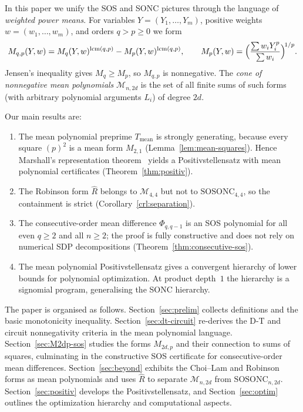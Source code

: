 \documentclass{amsart}
\theoremstyle{definition}
\numberwithin{equation}{section}
\begin{document}
In this paper we unify the SOS and SONC pictures through the language of
\emph{weighted power means}.  For variables $Y=(Y_1,\dots,Y_m)$, positive
weights $w=(w_1,\dots,w_m)$, and orders $q>p\ge0$ we form
\[
M_{q,p}(Y,w)=M_q(Y,w)^{\operatorname{lcm}(q,p)}-M_p(Y,w)^{\operatorname{lcm}(q,p)},
\qquad
M_p(Y,w)=\Bigl(\frac{\sum w_iY_i^p}{\sum w_i}\Bigr)^{\!1/p}.
\]
Jensen's inequality gives $M_q\ge M_p$, so $M_{q,p}$ is nonnegative.
The \emph{cone of nonnegative mean polynomials} $\mathcal{M}_{n,2d}$ is the
set of all finite sums of such forms (with arbitrary polynomial arguments
$L_i$) of degree $2d$.

Our main results are:

\begin{enumerate}
  \item The mean polynomial preprime $T_{\mathrm{mean}}$ is strongly
  generating, because every square $(p)^2$ is a mean form $M_{2,1}$
  (Lemma~\ref{lem:mean-squares}).  Hence Marshall's representation
  theorem~\cite{Marshall02} yields a Positivstellensatz with mean polynomial
  certificates (Theorem~\ref{thm:positiv}).

  \item The Robinson form $\hat{R}$ belongs to $\mathcal{M}_{4,4}$ but not
  to $\mathrm{SOSONC}_{4,4}$, so the containment is strict
  (Corollary~\ref{crl:separation}).

  \item The consecutive-order mean difference $\Phi_{q,q-1}$ is an SOS
  polynomial for all even $q\ge2$ and all $n\ge2$; the proof is fully
  constructive and does not rely on numerical SDP decompositions
  (Theorem~\ref{thm:consecutive-sos}).

  \item The mean polynomial Positivstellensatz gives a convergent hierarchy
  of lower bounds for polynomial optimization.  At product depth~$1$ the
  hierarchy is a signomial program, generalising the SONC hierarchy.
\end{enumerate}

The paper is organised as follows.  Section~\ref{sec:prelim} collects
definitions and the basic monotonicity inequality.  Section~\ref{sec:dt-circuit}
re-derives the D-T and circuit nonnegativity criteria in the mean polynomial
language.  Section~\ref{sec:M2dp-sos} studies the forms $M_{2d,p}$ and
their connection to sums of squares, culminating in the constructive SOS
certificate for consecutive-order mean differences.
Section~\ref{sec:beyond} exhibits the Choi--Lam and Robinson forms as mean
polynomials and uses $\hat{R}$ to separate $\mathcal{M}_{n,2d}$ from
$\mathrm{SOSONC}_{n,2d}$.  Section~\ref{sec:positiv} develops the
Positivstellensatz, and Section~\ref{sec:optim} outlines the optimization
hierarchy and computational aspects.
\end{document}
